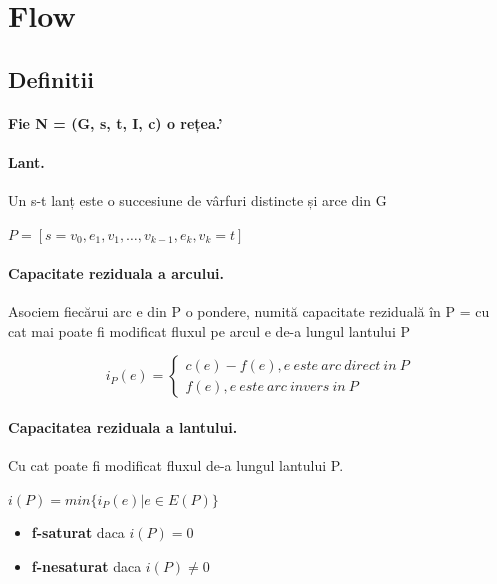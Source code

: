 \documentclass{article}
\begin{document}
\section{Flow}
\subsection*{Definitii}
\paragraph*{Fie N = (G, {s}, {t}, I, c) o rețea.'}
\paragraph*{Lant.} Un s-t lanț este o succesiune de vârfuri distincte și arce din G
\begin{center}
    $P = [ s=v_0, e_1, v_1, …, v_{k-1}, e_k, v_k=t ]$
\end{center}
\paragraph*{Capacitate reziduala a arcului.} Asociem fiecărui arc e din P o pondere, numită capacitate reziduală în P = cu cat mai poate fi modificat fluxul pe arcul e de-a lungul lantului P
\begin{center}
    \[
        i_P(e) = \left\{
        \begin{array}{ll}
            c(e) - f(e), e \ este \ arc \ direct \ in \ P \\
            f(e), e \ este \ arc \ invers \ in \ P
        \end{array}
        \right.
    \]
\end{center}

\paragraph*{Capacitatea reziduala a lantului.} Cu cat poate fi modificat fluxul de-a lungul lantului P.
\begin{center}
    $i(P) = min \{i_P(e) | e \in E(P)\}$
\end{center}
\begin{itemize}
    \item \textbf{f-saturat} daca $i(P)=0$
    \item \textbf{f-nesaturat} daca $i(P) \neq 0$
\end{itemize}
\end{document}
